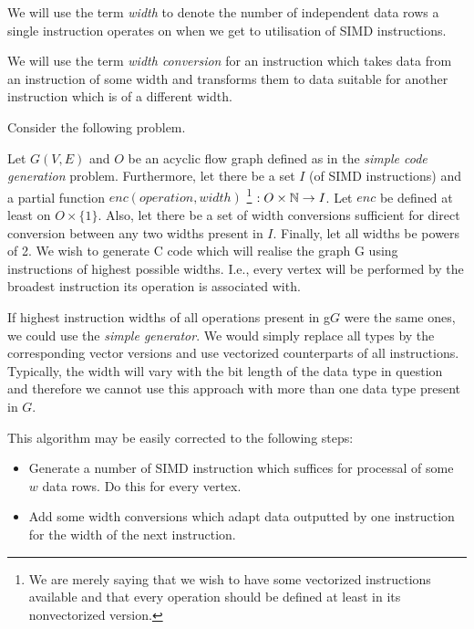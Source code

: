 \label{sec:vecgensec}

We will use the term \emph{width} to denote the number of independent data rows a single instruction operates on when we get to utilisation of SIMD instructions.
\myenddef

  We will use the term \emph{width conversion} for an instruction which takes data from an instruction of some width and transforms them to data suitable for another instruction which is of a different width. 
\myenddef

Consider the following problem.

  Let $G(V,E)$ and $O$ be an acyclic flow graph defined as in the \emph{simple code generation} problem. Furthermore, let there be a set $I$ (of SIMD instructions) and a partial function $enc (operation, width)$ \footnote{We are merely saying that we wish to have some vectorized instructions available and that every operation should be defined at least in its nonvectorized version.} $: O \times \mathbb{N} \rightarrow I$. Let $enc$ be defined at least on $O \times \{1\}$. Also, let there be a set of width conversions sufficient for direct conversion between any two widths present in $I$. Finally, let all widths be powers of 2. We wish to generate C code which will realise the graph G using instructions of highest possible widths. I.e., every vertex will be performed by the broadest instruction its operation is associated with. 
\myendprob

If highest instruction widths of all operations present in g$G$ were the same ones, we could use the \emph{simple generator}. We would simply replace all types by the corresponding vector versions and use vectorized counterparts of all instructions. Typically, the width will vary with the bit length of the data type in question and therefore we cannot use this approach with more than one data type present in $G$.


This algorithm may be easily corrected to the following steps:
\begin{itemize}
  \item Generate a number of SIMD instruction which suffices for processal of some $w$ data rows. Do this for every vertex.
  \item Add some width conversions which adapt data outputted by one instruction for the width of the next instruction.
\end{itemize}

